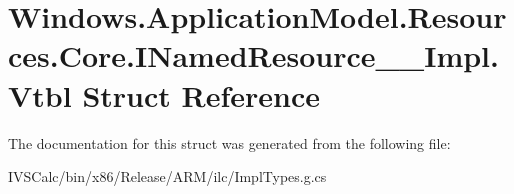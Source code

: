 \hypertarget{struct_windows_1_1_application_model_1_1_resources_1_1_core_1_1_i_named_resource_____impl_1_1_vtbl}{}\section{Windows.\+Application\+Model.\+Resources.\+Core.\+I\+Named\+Resource\+\_\+\+\_\+\+Impl.\+Vtbl Struct Reference}
\label{struct_windows_1_1_application_model_1_1_resources_1_1_core_1_1_i_named_resource_____impl_1_1_vtbl}


The documentation for this struct was generated from the following file\+:\begin{DoxyCompactItemize}
\item 
I\+V\+S\+Calc/bin/x86/\+Release/\+A\+R\+M/ilc/Impl\+Types.\+g.\+cs\end{DoxyCompactItemize}
